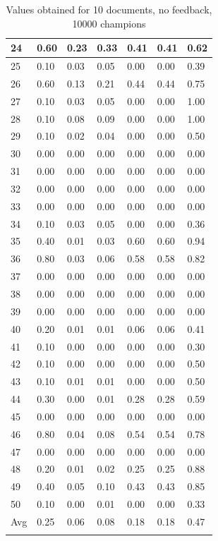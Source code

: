 \documentclass[12pt]{article}
\begin{document}
\begin{longtable}[c]{|l|l|l|l|l|l|l|}
  24 & 0.60 & 0.23 & 0.33 & 0.41 & 0.41 & 0.62 \\ \hline
  25 & 0.10 & 0.03 & 0.05 & 0.00 & 0.00 & 0.39 \\ \hline
  26 & 0.60 & 0.13 & 0.21 & 0.44 & 0.44 & 0.75 \\ \hline
  27 & 0.10 & 0.03 & 0.05 & 0.00 & 0.00 & 1.00 \\ \hline
  28 & 0.10 & 0.08 & 0.09 & 0.00 & 0.00 & 1.00 \\ \hline
  29 & 0.10 & 0.02 & 0.04 & 0.00 & 0.00 & 0.50 \\ \hline
  30 & 0.00 & 0.00 & 0.00 & 0.00 & 0.00 & 0.00 \\ \hline
  31 & 0.00 & 0.00 & 0.00 & 0.00 & 0.00 & 0.00 \\ \hline
  32 & 0.00 & 0.00 & 0.00 & 0.00 & 0.00 & 0.00 \\ \hline
  33 & 0.00 & 0.00 & 0.00 & 0.00 & 0.00 & 0.00 \\ \hline
  34 & 0.10 & 0.03 & 0.05 & 0.00 & 0.00 & 0.36 \\ \hline
  35 & 0.40 & 0.01 & 0.03 & 0.60 & 0.60 & 0.94 \\ \hline
  36 & 0.80 & 0.03 & 0.06 & 0.58 & 0.58 & 0.82 \\ \hline
  37 & 0.00 & 0.00 & 0.00 & 0.00 & 0.00 & 0.00 \\ \hline
  38 & 0.00 & 0.00 & 0.00 & 0.00 & 0.00 & 0.00 \\ \hline
  39 & 0.00 & 0.00 & 0.00 & 0.00 & 0.00 & 0.00 \\ \hline
  40 & 0.20 & 0.01 & 0.01 & 0.06 & 0.06 & 0.41 \\ \hline
  41 & 0.10 & 0.00 & 0.00 & 0.00 & 0.00 & 0.30 \\ \hline
  42 & 0.10 & 0.00 & 0.00 & 0.00 & 0.00 & 0.50 \\ \hline
  43 & 0.10 & 0.01 & 0.01 & 0.00 & 0.00 & 0.50 \\ \hline
  44 & 0.30 & 0.00 & 0.01 & 0.28 & 0.28 & 0.59 \\ \hline
  45 & 0.00 & 0.00 & 0.00 & 0.00 & 0.00 & 0.00 \\ \hline
  46 & 0.80 & 0.04 & 0.08 & 0.54 & 0.54 & 0.78 \\ \hline
  47 & 0.00 & 0.00 & 0.00 & 0.00 & 0.00 & 0.00 \\ \hline
  48 & 0.20 & 0.01 & 0.02 & 0.25 & 0.25 & 0.88 \\ \hline
  49 & 0.40 & 0.05 & 0.10 & 0.43 & 0.43 & 0.85 \\ \hline
  50 & 0.10 & 0.00 & 0.01 & 0.00 & 0.00 & 0.33 \\ \hline
  Avg & 0.25 & 0.06 & 0.08 & 0.18 & 0.18 & 0.47 \\ \hline
  \caption{Values obtained for 10 documents, no feedback, 10000 champions}
  \label{tab:tab1}\\
  \end{longtable}
\end{document}
